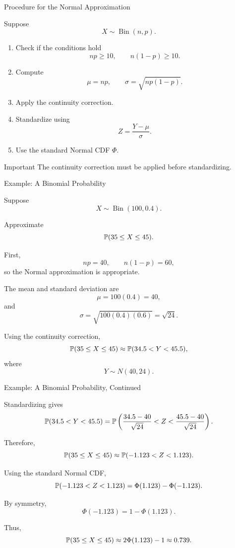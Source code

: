 \begin{frame}{Procedure for the Normal Approximation}

Suppose
\[
X\sim\operatorname{Bin}(n,p).
\]

\begin{enumerate}
    \item Check if the conditions hold
    \[
    np\geq 10,
    \qquad
    n(1-p)\geq 10.
    \]

    \item Compute
    \[
    \mu=np,
    \qquad
    \sigma=\sqrt{np(1-p)}.
    \]

    \item Apply the continuity correction.

    \item Standardize using
    \[
    Z=\frac{Y-\mu}{\sigma}.
    \]

    \item Use the standard Normal CDF \(\Phi\).
\end{enumerate}

\begin{keybox}{Important}
The continuity correction must be applied before standardizing.
\end{keybox}

\end{frame}


\begin{frame}{Example: A Binomial Probability}

Suppose
\[
X\sim\operatorname{Bin}(100,0.4).
\]

Approximate
\[
\mathbb{P}(35\leq X\leq 45).
\]

First,
\[
np=40,
\qquad
n(1-p)=60,
\]
so the Normal approximation is appropriate.

The mean and standard deviation are
\[
\mu=100(0.4)=40,
\]
and
\[
\sigma
=
\sqrt{100(0.4)(0.6)}
=
\sqrt{24}.
\]

Using the continuity correction,
\[
\mathbb{P}(35\leq X\leq45)
\approx
\mathbb{P}(34.5<Y<45.5),
\]
where
\[
Y\sim N(40,24).
\]

\end{frame}


\begin{frame}{Example: A Binomial Probability, Continued}

Standardizing gives
\[
\mathbb{P}(34.5<Y<45.5)
=
\mathbb{P}\left(
\frac{34.5-40}{\sqrt{24}}
<
Z
<
\frac{45.5-40}{\sqrt{24}}
\right).
\]

Therefore,
\[
\mathbb{P}(35\leq X\leq45)
\approx
\mathbb{P}(-1.123<Z<1.123).
\]

Using the standard Normal CDF,
\[
\mathbb{P}(-1.123<Z<1.123)
=
\Phi(1.123)-\Phi(-1.123).
\]

By symmetry,
\[
\Phi(-1.123)=1-\Phi(1.123).
\]

Thus,
\[
\mathbb{P}(35\leq X\leq45)
\approx
2\Phi(1.123)-1
\approx
0.739.
\]

\end{frame}


